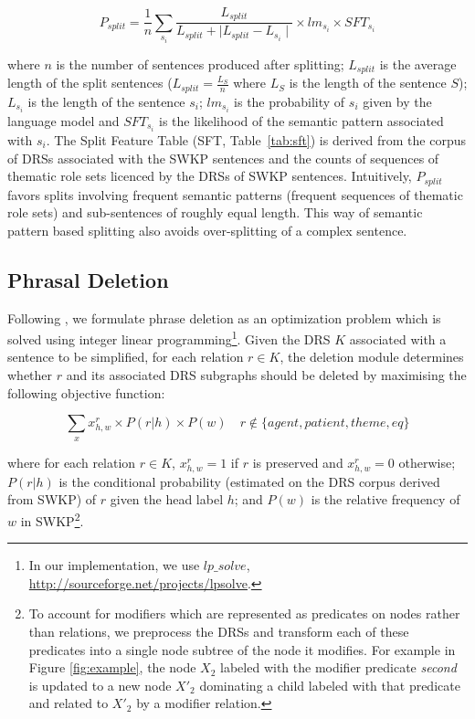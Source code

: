 \documentclass[11pt,a4paper]{article}
\newcommand{\nlang}[1]{{\it #1}}
\begin{document}
{
  \footnotesize
  \vspace{-0.4cm}
  \begin{equation*}\label{eq:split} P_{split} = \frac{1}{n} \sum_{s_i} 
    \frac{L_{split}}{L_{split}+\mid L_{split} - L_{s_i} \mid } \times
    lm_{s_i} \times SFT_{s_i}
  \end{equation*}
  \vspace{-0.3cm}
}

where $n$ is the number of sentences produced after splitting;
$L_{split}$ is the average length of the split sentences ($L_{split} =
\frac{L_S }{n}$ where $L_S$ is the length of the sentence $S$);
$L_{s_i}$ is the length of the sentence $s_i$; $lm_{s_i}$ is the
probability of $s_i$ given by the language model and $SFT_{s_i}$ is
the likelihood of the semantic pattern associated with $s_i$. The
Split Feature Table (SFT, Table~\ref{tab:sft}) is derived from the
corpus of DRSs associated with the SWKP sentences and the counts of
sequences of thematic role sets licenced by the DRSs of SWKP
sentences. Intuitively, $P_{split}$ favors splits involving frequent
semantic patterns (frequent sequences of thematic role sets) and
sub-sentences of roughly equal length. This way of semantic pattern
based splitting also avoids over-splitting of a complex sentence.




\subsection{Phrasal Deletion}
\label{subsec:deletion}

Following , we formulate phrase
deletion as an optimization problem which is solved using integer
linear programming\footnote{In our implementation, we use $lp\_solve$,
  \url{http://sourceforge.net/projects/lpsolve}. }. Given the DRS $K$
associated with a sentence to be simplified, for each relation $r\in
K$, the deletion module determines whether $r$ and its associated DRS
subgraphs should be deleted by maximising the following objective
function:

{
  \footnotesize
  \vspace{-0.15cm}
  \begin{equation*}
    \sum_{x} x^r_{h,w} \times P(r|h) \times P(w) \quad r \not\in
    \{agent, patient, theme, eq\}
  \end{equation*}
  \vspace{-0.25cm}
}

where for each relation $r\in K$, $x^r_{h,w} = 1$ if $r$ is preserved
and $x^{r}_{h,w} = 0$ otherwise; $P(r|h)$ is the conditional
probability (estimated on the DRS corpus derived from SWKP) of $r$
given the head label $h$; and $P(w)$ is the relative frequency of $w$
in SWKP\footnote{To account for modifiers which are represented as
  predicates on nodes rather than relations, we preprocess the DRSs
  and transform each of these predicates into a single node subtree of
  the node it modifies. For example in Figure \ref{fig:example},
  the node $X_2$ labeled with the modifier predicate \nlang{second} is
  updated to a new node $X'_2$ dominating a child labeled with that
  predicate and related to $X'_2$ by a modifier relation.}.
\end{document}
